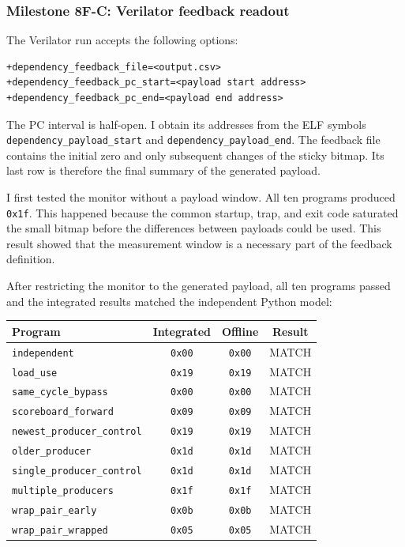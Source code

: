 \subsubsection*{Milestone 8F-C: Verilator feedback readout}

The Verilator run accepts the following options:

\begin{verbatim}
+dependency_feedback_file=<output.csv>
+dependency_feedback_pc_start=<payload start address>
+dependency_feedback_pc_end=<payload end address>
\end{verbatim}

The PC interval is half-open. I obtain its addresses from the ELF symbols
\texttt{dependency\_payload\_start} and
\texttt{dependency\_payload\_end}. The feedback file contains the initial zero
and only subsequent changes of the sticky bitmap. Its last row is therefore the
final summary of the generated payload.

I first tested the monitor without a payload window. All ten programs produced
\texttt{0x1f}. This happened because the common startup, trap, and exit code
saturated the small bitmap before the differences between payloads could be
used. This result showed that the measurement window is a necessary part of the
feedback definition.

After restricting the monitor to the generated payload, all ten programs
passed and the integrated results matched the independent Python model:

\begin{center}
\begin{tabular}{lccc}
\hline
Program & Integrated & Offline & Result \\
\hline
\texttt{independent}               & \texttt{0x00} & \texttt{0x00} & MATCH \\
\texttt{load\_use}                 & \texttt{0x19} & \texttt{0x19} & MATCH \\
\texttt{same\_cycle\_bypass}      & \texttt{0x00} & \texttt{0x00} & MATCH \\
\texttt{scoreboard\_forward}      & \texttt{0x09} & \texttt{0x09} & MATCH \\
\texttt{newest\_producer\_control}& \texttt{0x19} & \texttt{0x19} & MATCH \\
\texttt{older\_producer}          & \texttt{0x1d} & \texttt{0x1d} & MATCH \\
\texttt{single\_producer\_control}& \texttt{0x1d} & \texttt{0x1d} & MATCH \\
\texttt{multiple\_producers}      & \texttt{0x1f} & \texttt{0x1f} & MATCH \\
\texttt{wrap\_pair\_early}       & \texttt{0x0b} & \texttt{0x0b} & MATCH \\
\texttt{wrap\_pair\_wrapped}     & \texttt{0x05} & \texttt{0x05} & MATCH \\
\hline
\end{tabular}
\end{center}

